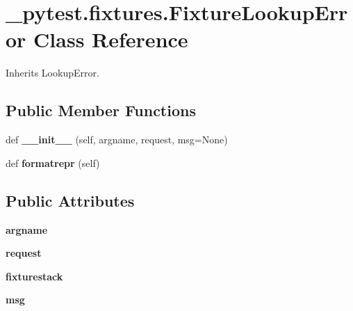 \hypertarget{class__pytest_1_1fixtures_1_1_fixture_lookup_error}{}\section{\+\_\+pytest.\+fixtures.\+Fixture\+Lookup\+Error Class Reference}
\label{class__pytest_1_1fixtures_1_1_fixture_lookup_error}


Inherits Lookup\+Error.

\subsection*{Public Member Functions}
\begin{DoxyCompactItemize}
\item 
\mbox{\label{class__pytest_1_1fixtures_1_1_fixture_lookup_error_af3666779176cb279f05cd46ae38df852}} 
def {\bfseries \+\_\+\+\_\+init\+\_\+\+\_\+} (self, argname, request, msg=None)
\item 
\mbox{\label{class__pytest_1_1fixtures_1_1_fixture_lookup_error_ac15a08e401c969c8aac8f55f46fbb0d5}} 
def {\bfseries formatrepr} (self)
\end{DoxyCompactItemize}
\subsection*{Public Attributes}
\begin{DoxyCompactItemize}
\item 
\mbox{\label{class__pytest_1_1fixtures_1_1_fixture_lookup_error_aa546f1d9c3fce0c80e1032fd05f9b2d8}} 
{\bfseries argname}
\item 
\mbox{\label{class__pytest_1_1fixtures_1_1_fixture_lookup_error_aff876cd322abbace3a66c22491ddcc29}} 
{\bfseries request}
\item 
\mbox{\label{class__pytest_1_1fixtures_1_1_fixture_lookup_error_ab8ef7efd882af5ac960119f5cbef506a}} 
{\bfseries fixturestack}
\item 
\mbox{\label{class__pytest_1_1fixtures_1_1_fixture_lookup_error_a5505c6dcb70f99efe3b899981b2045a4}} 
{\bfseries msg}
\end{DoxyCompactItemize}


